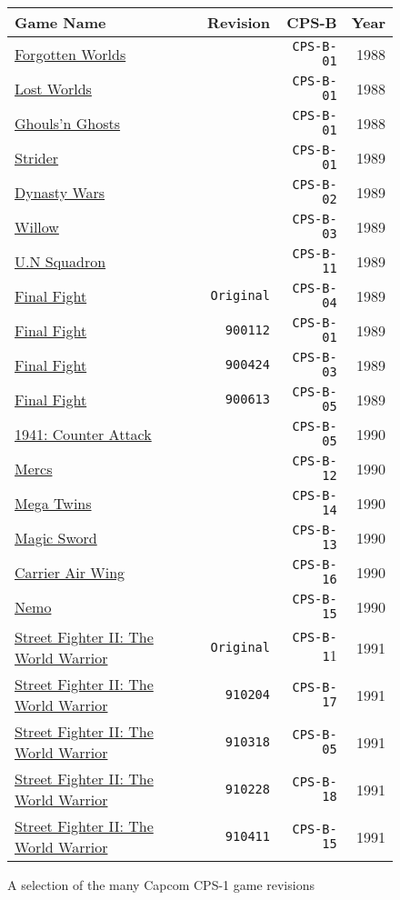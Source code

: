 \begin{figure}[H]
{ \setlength{\tabcolsep}{3.0pt}
\begin{tabularx}{\textwidth}{Xrrr} 
  \textbf{Game Name} & \textbf{Revision} & \textbf{ CPS-B }  & \textbf{ Year } \\               
  \toprule    
\href{}{Forgotten Worlds} & & \texttt{CPS-B-01} & 1988 \\ 
\href{}{Lost Worlds} & & \texttt{CPS-B-01} & 1988 \\ 
\href{}{Ghouls'n Ghosts} & & \texttt{CPS-B-01} & 1988 \\ 
  \toprule    
\href{}{Strider} & & \texttt{CPS-B-01} & 1989 \\ 
\href{}{Dynasty Wars} & & \texttt{CPS-B-02} & 1989 \\ 
\href{}{Willow} & & \texttt{CPS-B-03} & 1989 \\ 
\href{}{U.N Squadron} & & \texttt{CPS-B-11}   & 1989 \\ 

\href{}{Final Fight } & \texttt{Original} & \texttt{CPS-B-04} & 1989 \\ %
\href{}{Final Fight } & \texttt{900112}& \texttt{CPS-B-01} & 1989 \\ %
\href{}{Final Fight } & \texttt{900424}& \texttt{CPS-B-03} & 1989 \\ %
\href{}{Final Fight } & \texttt{900613}& \texttt{CPS-B-05} & 1989 \\ %

  \toprule    
\href{}{1941: Counter Attack} & & \texttt{CPS-B-05} &  1990 \\ 
\href{}{Mercs} & &  \texttt{CPS-B-12} & 1990 \\ 
\href{}{Mega Twins} & & \texttt{CPS-B-14} & 1990 \\ 
\href{}{Magic Sword} & & \texttt{CPS-B-13} & 1990 \\ 
\href{}{Carrier Air Wing} & & \texttt{CPS-B-16}  & 1990 \\ 
\href{}{Nemo} & & \texttt{CPS-B-15} &  1990 \\ 
  \toprule    
\href{}{Street Fighter II: The World Warrior }&  \texttt{Original}& \texttt{CPS-B-1}1 & 1991 \\  %
\href{}{Street Fighter II: The World Warrior } & \texttt{910204}& \texttt{CPS-B-17} & 1991 \\  %
\href{}{Street Fighter II: The World Warrior } & \texttt{910318}& \texttt{CPS-B-05} & 1991 \\  %
\href{}{Street Fighter II: The World Warrior } & \texttt{910228}& \texttt{CPS-B-18} & 1991 \\  %
\href{}{Street Fighter II: The World Warrior } & \texttt{910411}& \texttt{CPS-B-15} & 1991 \\  %
\toprule    
\end{tabularx}%
}\caption*{A selection of the many Capcom CPS-1 game revisions}
\end{figure}

